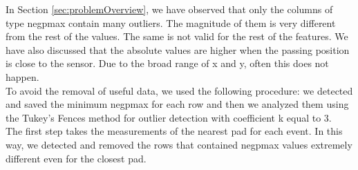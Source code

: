 \documentclass[conference]{IEEEtran}
\begin{document}
In Section \ref{sec:problemOverview}, we have observed that only the columns of type negpmax contain many outliers. The magnitude of them is very different from the rest of the values. The same is not valid for the rest of the features.
We have also discussed that the absolute values are higher when the passing position is close to the sensor. Due to the broad range of x and y, often this does not happen. \\ 
To avoid the removal of useful data, we used the following procedure: we detected and saved the minimum negpmax for each row and then we analyzed them using the Tukey's Fences method for outlier detection with coefficient k equal to 3. \\
The first step takes the measurements of the nearest pad for each event. In this way, we detected and removed the rows that contained negpmax values extremely different even for the closest pad.
 
\end{document}
